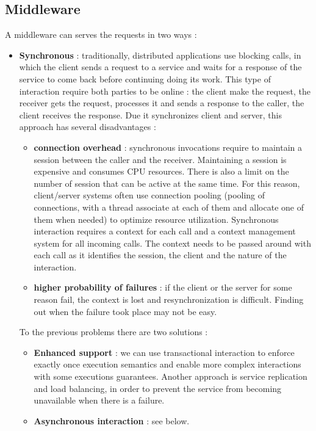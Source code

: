 \subsection{Middleware}
A middleware can serves the requests in two ways :
\begin{itemize}
    \item \textbf{Synchronous} : traditionally, distributed applications use blocking calls, in which the client sends a request to a service and waits for a response of the service to come back before continuing doing its work. This type of interaction require both parties to be online : the client make the request, the receiver gets the request, processes it and sends a response to the caller, the client receives the response. Due it synchronizes client and server, this approach has several disadvantages :
          \begin{itemize}
              \item \textbf{connection overhead} : synchronous invocations require to maintain a session between the caller and the receiver. Maintaining a session is expensive and consumes CPU resources. There is also a limit on the number of session that can be active at the same time. For this reason, client/server systems often use connection pooling (pooling of connections, with a thread associate at each of them and allocate one of them when needed) to optimize resource utilization. Synchronous interaction requires a context for each call and a context management system for all incoming calls. The context needs to be passed around with each call as it identifies the session, the client and the nature of the interaction.
              \item \textbf{higher probability of failures} : if the client or the server for some reason fail, the context is lost and resynchronization is difficult. Finding out when the failure took place may not be easy.
          \end{itemize}
          To the previous problems there are two solutions :
          \begin{itemize}
              \item \textbf{Enhanced support} : we can use transactional interaction to enforce exactly once execution semantics and enable more complex interactions with some executions guarantees. Another approach is service replication and load balancing, in order to prevent the service from becoming unavailable when there is a failure.
              \item \textbf{Asynchronous interaction} : see below.

\end{itemize}
\end{itemize}
